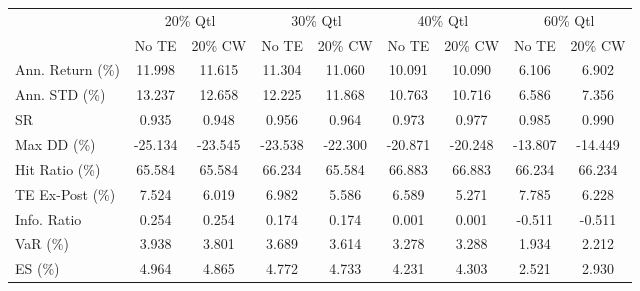 \begin{tabular}{lcccccccc}
\toprule
{} & \multicolumn{2}{c}{20\% Qtl} & \multicolumn{2}{c}{30\% Qtl} & \multicolumn{2}{c}{40\% Qtl} & \multicolumn{2}{c}{60\% Qtl} \\
{} &   No TE &  20\% CW &   No TE &  20\% CW &   No TE &  20\% CW &   No TE &  20\% CW \\
\midrule
Ann. Return (\%) &  11.998 &  11.615 &  11.304 &  11.060 &  10.091 &  10.090 &   6.106 &   6.902 \\
Ann. STD (\%)    &  13.237 &  12.658 &  12.225 &  11.868 &  10.763 &  10.716 &   6.586 &   7.356 \\
SR              &   0.935 &   0.948 &   0.956 &   0.964 &   0.973 &   0.977 &   0.985 &   0.990 \\
Max DD (\%)      & -25.134 & -23.545 & -23.538 & -22.300 & -20.871 & -20.248 & -13.807 & -14.449 \\
Hit Ratio (\%)   &  65.584 &  65.584 &  66.234 &  65.584 &  66.883 &  66.883 &  66.234 &  66.234 \\
TE Ex-Post (\%)  &   7.524 &   6.019 &   6.982 &   5.586 &   6.589 &   5.271 &   7.785 &   6.228 \\
Info. Ratio     &   0.254 &   0.254 &   0.174 &   0.174 &   0.001 &   0.001 &  -0.511 &  -0.511 \\
VaR (\%)         &   3.938 &   3.801 &   3.689 &   3.614 &   3.278 &   3.288 &   1.934 &   2.212 \\
ES (\%)          &   4.964 &   4.865 &   4.772 &   4.733 &   4.231 &   4.303 &   2.521 &   2.930 \\
\bottomrule
\end{tabular}
